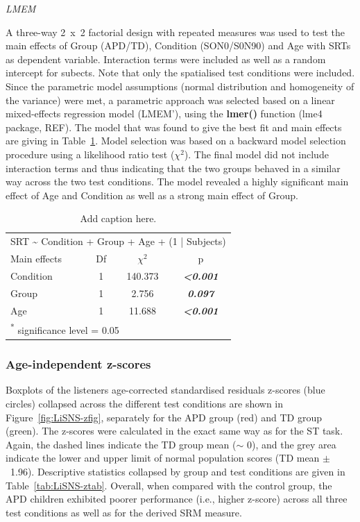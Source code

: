 \documentclass[a4paper, twoside]{templates/ociamthesis}
\begin{document}
\colorbox[HTML]{CCCCFF}{\emph{LMEM}}

A three-way 2~x~2 factorial design with repeated measures was used to test the main effects of Group (APD/TD), Condition (SON0/S0N90) and Age with SRTs as dependent variable. Interaction terms were included as well as a random intercept for subects. Note that only the spatialised test conditions were included. Since the parametric model assumptions (normal distribution and homogeneity of the variance) were met, a parametric approach was selected based on a linear mixed-effects regression model (LMEM'), using the \textbf{lmer()} function (lme4 package, REF). The model that was found to give the best fit and main effects are giving in Table~\ref{tab:LiSNS-AgeLMEM}. Model selection was based on a backward model selection procedure using a likelihood ratio test (\(\chi^{2}\)). The final model did not include interaction terms and thus indicating that the two groups behaved in a similar way across the two test conditions. The model revealed a highly significant main effect of Age and Condition as well as a strong main effect of Group.

\begin{table}

\caption{\label{tab:LiSNS-AgeLMEM}Add caption here.}
\centering
\begin{tabular}[t]{lcc>{}c}
\toprule
\multicolumn{4}{c}{SRT \textasciitilde{} Condition + Group + Age + (1 | Subjects)} \\
\cmidrule(l{3pt}r{3pt}){1-4}
Main effects & Df & $\chi^{2}$ & p\\
\midrule
Condition & 1 & 140.373 & \em{\textbf{<0.001}}\\
Group & 1 & 2.756 & \em{\textbf{0.097}}\\
Age & 1 & 11.688 & \em{\textbf{<0.001}}\\
\bottomrule
\multicolumn{4}{l}{\textsuperscript{*} significance level = 0.05}\\
\end{tabular}
\end{table}

\hypertarget{age-independent-z-scores-1}{%
\subsubsection*{Age-independent z-scores}\label{age-independent-z-scores-1}}

Boxplots of the listeners age-corrected standardised residuals z-scores (blue circles) collapsed across the different test conditions are shown in Figure~\ref{fig:LiSNS-zfig}, separately for the APD group (red) and TD group (green). The z-scores were calculated in the exact same way as for the ST task. Again, the dashed lines indicate the TD group mean (\(\sim\) 0), and the grey area indicate the lower and upper limit of normal population scores (TD mean \(\pm\)~1.96). Descriptive statistics collapsed by group and test conditions are given in Table~\ref{tab:LiSNS-ztab}. Overall, when compared with the control group, the APD children exhibited poorer performance (i.e., higher z-score) across all three test conditions as well as for the derived SRM measure.
\end{document}
